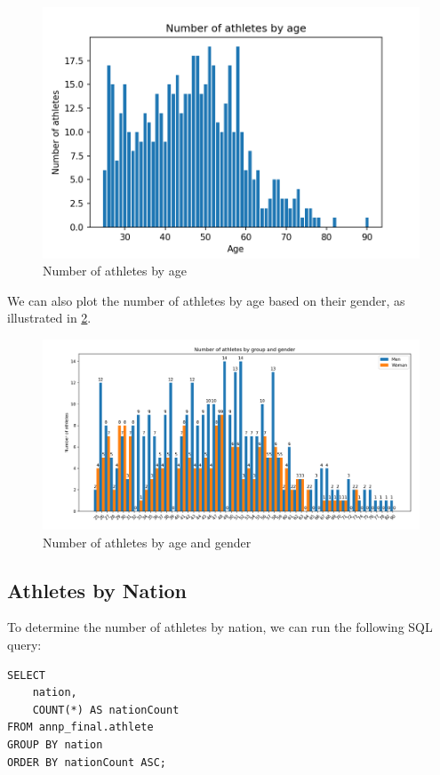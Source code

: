 \documentclass[a4paper, 11pt]{article}
\begin{document}
\vspace{\baselineskip}

\begin{figure}[H]
    \centering
    \includegraphics[width=.8\textwidth]{img/athletesbyage.png}
    \caption{Number of athletes by age}
    \label{fig:athletesbyage}
\end{figure}

We can also plot the number of athletes by age based on their gender, as illustrated in \cref{fig:athletesbyageandgender}.

\begin{figure}[H]
    \centering
    \includegraphics[width=\textwidth]{img/athletesbyageandgender.png}
    \caption{Number of athletes by age and gender}
    \label{fig:athletesbyageandgender}
\end{figure}

\subsection{Athletes by Nation}

To determine the number of athletes by nation, we can run the following SQL query:

\begin{verbatim}
SELECT
    nation,
    COUNT(*) AS nationCount
FROM annp_final.athlete
GROUP BY nation
ORDER BY nationCount ASC;
\end{verbatim}
\end{document}
